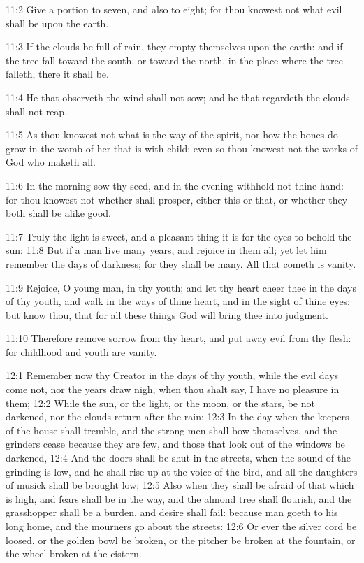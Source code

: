 11:2 Give a portion to seven, and also to eight; for thou knowest not
what evil shall be upon the earth.

11:3 If the clouds be full of rain, they empty themselves upon the
earth: and if the tree fall toward the south, or toward the north, in
the place where the tree falleth, there it shall be.

11:4 He that observeth the wind shall not sow; and he that regardeth
the clouds shall not reap.

11:5 As thou knowest not what is the way of the spirit, nor how the
bones do grow in the womb of her that is with child: even so thou
knowest not the works of God who maketh all.

11:6 In the morning sow thy seed, and in the evening withhold not
thine hand: for thou knowest not whether shall prosper, either this or
that, or whether they both shall be alike good.

11:7 Truly the light is sweet, and a pleasant thing it is for the eyes
to behold the sun: 11:8 But if a man live many years, and rejoice in
them all; yet let him remember the days of darkness; for they shall be
many. All that cometh is vanity.

11:9 Rejoice, O young man, in thy youth; and let thy heart cheer thee
in the days of thy youth, and walk in the ways of thine heart, and in
the sight of thine eyes: but know thou, that for all these things God
will bring thee into judgment.

11:10 Therefore remove sorrow from thy heart, and put away evil from
thy flesh: for childhood and youth are vanity.

12:1 Remember now thy Creator in the days of thy youth, while the evil
days come not, nor the years draw nigh, when thou shalt say, I have no
pleasure in them; 12:2 While the sun, or the light, or the moon, or
the stars, be not darkened, nor the clouds return after the rain: 12:3
In the day when the keepers of the house shall tremble, and the strong
men shall bow themselves, and the grinders cease because they are few,
and those that look out of the windows be darkened, 12:4 And the doors
shall be shut in the streets, when the sound of the grinding is low,
and he shall rise up at the voice of the bird, and all the daughters
of musick shall be brought low; 12:5 Also when they shall be afraid of
that which is high, and fears shall be in the way, and the almond tree
shall flourish, and the grasshopper shall be a burden, and desire
shall fail: because man goeth to his long home, and the mourners go
about the streets: 12:6 Or ever the silver cord be loosed, or the
golden bowl be broken, or the pitcher be broken at the fountain, or
the wheel broken at the cistern.

